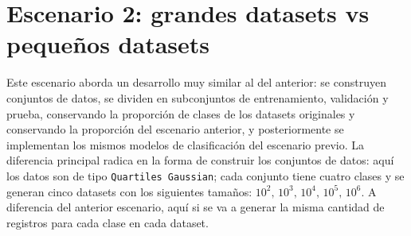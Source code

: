 \documentclass[12pt,a4paper]{article}
\begin{document}
\section{Escenario 2: grandes datasets vs pequeños datasets}

Este escenario aborda un desarrollo muy similar al del anterior: se construyen conjuntos de datos, se dividen en subconjuntos de entrenamiento, 
validación y prueba, conservando la proporción de clases de los datasets originales y conservando la proporción del escenario anterior, 
y posteriormente se implementan los mismos modelos de clasificación del escenario previo. La diferencia principal radica en la forma de construir 
los conjuntos de datos: aquí los datos son de tipo \texttt{Quartiles Gaussian}; cada conjunto tiene cuatro clases y se generan cinco datasets 
con los siguientes tamaños: \(10^2,\,10^3,\,10^4,\,10^5,\,10^6\). A diferencia del anterior escenario, aquí si se va a generar la misma cantidad de 
registros para cada clase en cada dataset.
\end{document}
